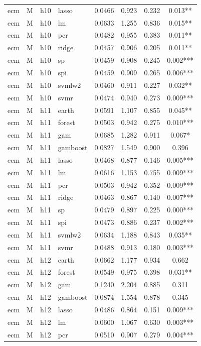 \begin{ThreePartTable}
\begin{longtable}[t]{llclcccc}
ecm & M & h10 & lasso & 0.0466 & 0.923 & 0.232 & 0.013**\\
ecm & M & h10 & lm & 0.0633 & 1.255 & 0.836 & 0.015**\\
ecm & M & h10 & pcr & 0.0482 & 0.955 & 0.383 & 0.011**\\
ecm & M & h10 & ridge & 0.0457 & 0.906 & 0.205 & 0.011**\\
ecm & M & h10 & sp & 0.0459 & 0.908 & 0.245 & 0.002***\\
ecm & M & h10 & spi & 0.0459 & 0.909 & 0.265 & 0.006***\\
ecm & M & h10 & svmlw2 & 0.0460 & 0.911 & 0.227 & 0.032**\\
ecm & M & h10 & svmr & 0.0474 & 0.940 & 0.273 & 0.009***\\
\addlinespace
ecm & M & h11 & earth & 0.0591 & 1.107 & 0.855 & 0.045**\\
ecm & M & h11 & forest & 0.0503 & 0.942 & 0.275 & 0.010***\\
ecm & M & h11 & gam & 0.0685 & 1.282 & 0.911 & 0.067*\\
ecm & M & h11 & gamboost & 0.0827 & 1.549 & 0.900 & 0.396\\
ecm & M & h11 & lasso & 0.0468 & 0.877 & 0.146 & 0.005***\\
ecm & M & h11 & lm & 0.0616 & 1.153 & 0.755 & 0.009***\\
ecm & M & h11 & pcr & 0.0503 & 0.942 & 0.352 & 0.009***\\
ecm & M & h11 & ridge & 0.0463 & 0.867 & 0.140 & 0.007***\\
ecm & M & h11 & sp & 0.0479 & 0.897 & 0.225 & 0.000***\\
ecm & M & h11 & spi & 0.0473 & 0.886 & 0.237 & 0.002***\\
ecm & M & h11 & svmlw2 & 0.0634 & 1.188 & 0.843 & 0.035**\\
ecm & M & h11 & svmr & 0.0488 & 0.913 & 0.180 & 0.003***\\
\addlinespace
ecm & M & h12 & earth & 0.0662 & 1.177 & 0.934 & 0.662\\
ecm & M & h12 & forest & 0.0549 & 0.975 & 0.398 & 0.031**\\
ecm & M & h12 & gam & 0.1240 & 2.204 & 0.885 & 0.311\\
ecm & M & h12 & gamboost & 0.0874 & 1.554 & 0.878 & 0.345\\
ecm & M & h12 & lasso & 0.0486 & 0.864 & 0.151 & 0.009***\\
ecm & M & h12 & lm & 0.0600 & 1.067 & 0.630 & 0.003***\\
ecm & M & h12 & pcr & 0.0510 & 0.907 & 0.279 & 0.004***\\

\end{longtable}
\end{ThreePartTable}

